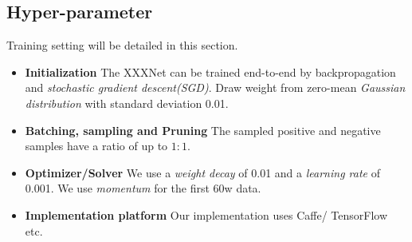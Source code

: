 \subsection{Hyper-parameter}

Training setting will be detailed in this section.

\begin{itemize}

    \item \textbf{Initialization} The XXXNet can be trained end-to-end by 
    backpropagation and \emph{stochastic gradient descent(SGD)}. Draw weight from zero-mean 
    \emph{Gaussian distribution} with standard deviation 0.01.

    \item \textbf{Batching, sampling and Pruning} The sampled positive and 
    negative samples have a ratio of up to $1:1$.

    \item \textbf{Optimizer/Solver} We use a \emph{weight decay} of 0.01 and 
    a \emph{learning rate} of 0.001. We use \emph{momentum} for the first 60w 
    data. 

    \item \textbf{Implementation platform} Our implementation 
    uses Caffe/ TensorFlow etc.\misscite

\end{itemize}